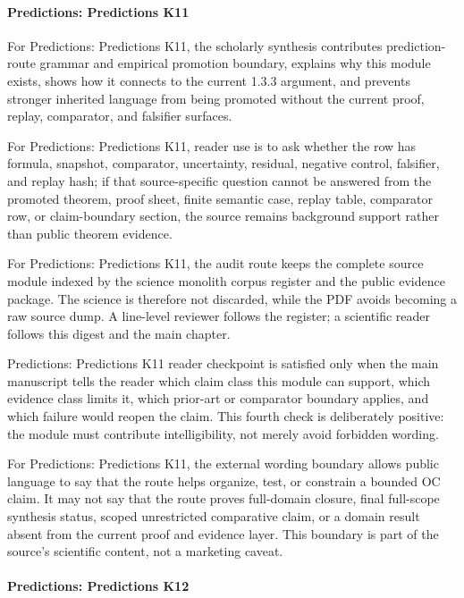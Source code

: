 \paragraph{Predictions: Predictions K11}

For Predictions: Predictions K11, the scholarly synthesis contributes prediction-route grammar and empirical promotion boundary, explains why this module exists, shows how it connects to the current 1.3.3 argument, and prevents stronger inherited language from being promoted without the current proof, replay, comparator, and falsifier surfaces.


For Predictions: Predictions K11, reader use is to ask whether the row has formula, snapshot, comparator, uncertainty, residual, negative control, falsifier, and replay hash; if that source-specific question cannot be answered from the promoted theorem, proof sheet, finite semantic case, replay table, comparator row, or claim-boundary section, the source remains background support rather than public theorem evidence.


For Predictions: Predictions K11, the audit route keeps the complete source module indexed by the science monolith corpus register and the public evidence package. The science is therefore not discarded, while the PDF avoids becoming a raw source dump. A line-level reviewer follows the register; a scientific reader follows this digest and the main chapter.


Predictions: Predictions K11 reader checkpoint is satisfied only when the main manuscript tells the reader which claim class this module can support, which evidence class limits it, which prior-art or comparator boundary applies, and which failure would reopen the claim. This fourth check is deliberately positive: the module must contribute intelligibility, not merely avoid forbidden wording.


For Predictions: Predictions K11, the external wording boundary allows public language to say that the route helps organize, test, or constrain a bounded OC claim. It may not say that the route proves full-domain closure, final full-scope synthesis status, scoped unrestricted comparative claim, or a domain result absent from the current proof and evidence layer. This boundary is part of the source's scientific content, not a marketing caveat.


\paragraph{Predictions: Predictions K12}

